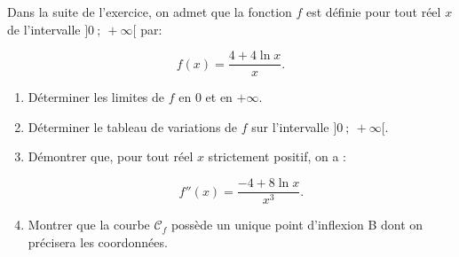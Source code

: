 \documentclass[10pt]{article}
\begin{document}
Dans la suite de l'exercice, on admet que la fonction $f$ est définie pour tout réel $x$ de l'intervalle $]0~;~ +\infty[$ par:

\[f(x) = \dfrac{4 + 4\ln x}{x}.\]

\begin{enumerate}[resume]
\item Déterminer les limites de $f$ en $0$ et en $+\infty$.
\item Déterminer le tableau de variations de $f$ sur l'intervalle $]0~;~ +\infty[$. 
\item Démontrer que, pour tout réel $x$ strictement positif, on a :

\[f''(x) = \dfrac{- 4 + 8\ln x}{x^3}.\]

\item Montrer que la courbe $\mathcal{C}_f$ possède un unique point d'inflexion B dont on précisera les coordonnées.
\end{enumerate}
\end{document}
